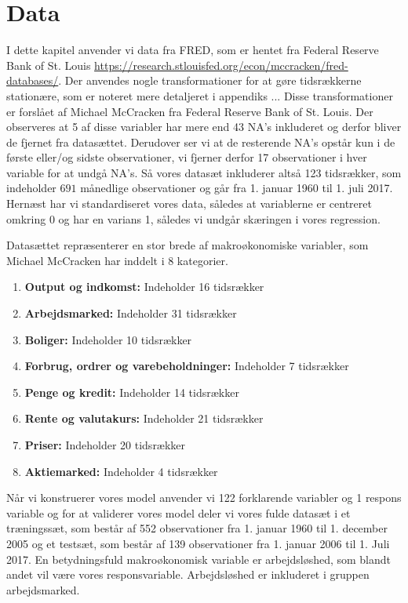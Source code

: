 \chapter{Data}
I dette kapitel anvender vi data fra FRED, som er hentet fra Federal Reserve Bank of St. Louis \url{https://research.stlouisfed.org/econ/mccracken/fred-databases/}.
Der anvendes nogle transformationer for at gøre tidsrækkerne stationære, som er noteret mere detaljeret i appendiks ... 
Disse transformationer er forslået af Michael McCracken fra Federal Reserve Bank of St. Louis.  
Der observeres at 5 af disse variabler har mere end 43 NA's inkluderet og derfor bliver de fjernet fra datasættet. 
Derudover ser vi at de resterende NA's opstår kun i de første eller/og sidste observationer, vi fjerner derfor 17 observationer i hver variable for at undgå NA's. 
Så vores datasæt inkluderer altså 123 tidsrækker, som indeholder $691$ månedlige observationer og går fra 1. januar 1960 til 1. juli 2017. 
Hernæst har vi standardiseret vores data, således at variablerne er centreret omkring 0 og har en varians 1, således vi undgår skæringen i vores regression. 

Datasættet repræsenterer en stor brede af makroøkonomiske variabler, som Michael McCracken har inddelt i 8 kategorier. 
\begin{enumerate}
\item \textbf{Output og indkomst:} Indeholder 16 tidsrækker
\item \textbf{Arbejdsmarked:}  Indeholder 31 tidsrækker
\item \textbf{Boliger:} Indeholder 10 tidsrækker
\item \textbf{Forbrug, ordrer og varebeholdninger:} Indeholder 7 tidsrækker
\item \textbf{Penge og kredit:} Indeholder 14 tidsrækker
\item\textbf{ Rente og valutakurs:} Indeholder 21 tidsrækker
\item \textbf{Priser:} Indeholder 20 tidsrækker
\item \textbf{Aktiemarked:} Indeholder 4 tidsrækker
\end{enumerate}

Når vi konstruerer vores model anvender vi 122 forklarende variabler og 1 respons variable og for at validerer vores model deler vi vores fulde datasæt i et træningssæt, som består af 552 observationer fra 1. januar 1960 til 1. december 2005 og et testsæt, som består af 139 observationer fra 1. januar 2006 til 1. Juli 2017. 
En betydningsfuld makroøkonomisk variable er arbejdsløshed, som blandt andet vil være vores responsvariable.  Arbejdsløshed er inkluderet i gruppen arbejdsmarked. 

